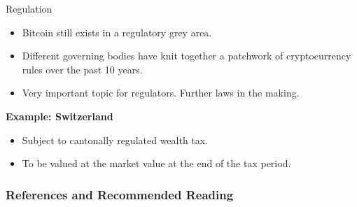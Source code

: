 \documentclass[]{beamer}
\begin{document}
\begin{frame}{Regulation}
\begin{itemize}
	\item Bitcoin still exists in a regulatory grey area.
	\item Different governing bodies have knit together a patchwork of cryptocurrency rules over the past 10 years. 
	\item Very important topic for regulators. Further laws in the making.
\end{itemize}
\vspace{1em}
\textbf{Example: Switzerland}
\begin{itemize}
	\item Subject to cantonally regulated wealth tax.
	\item To be valued at the market value at the end of the tax period.
\end{itemize}

\end{frame}

\begin{frame}%
\frametitle{References and Recommended Reading}
	
	
\end{frame}
\end{document}
